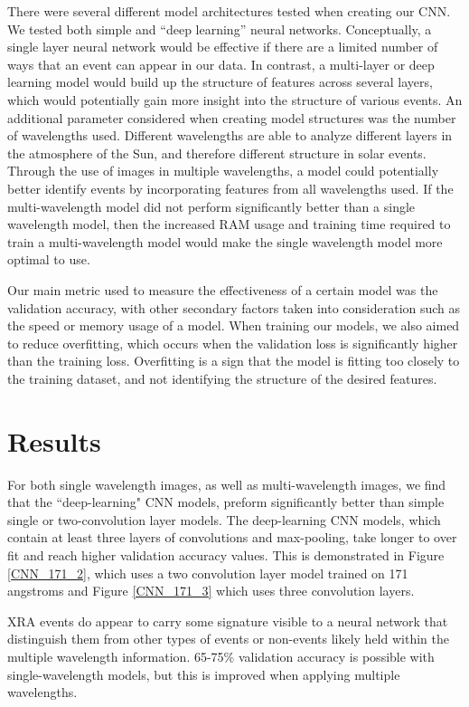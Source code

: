 \documentclass[12pt, letterpaper]{article}
\begin{document}

There were several different model architectures tested when creating our CNN. We tested both simple and “deep learning” neural networks. Conceptually, a single layer neural network would be effective if there are a limited number of ways that an event can appear in our data. In contrast, a multi-layer or deep learning model would build up the structure of features across several layers, which would potentially gain more insight into the structure of various events. An additional parameter considered when creating model structures was the number of wavelengths used. Different wavelengths are able to analyze different layers in the atmosphere of the Sun, and therefore different structure in solar events. Through the use of images in multiple wavelengths, a model could potentially better identify events by incorporating features from all wavelengths used. If the multi-wavelength model did not perform significantly better than a single wavelength model, then the increased RAM usage and training time required to train a multi-wavelength model would make the single wavelength model more optimal to use. 

Our main metric used to measure the effectiveness of a certain model was the validation accuracy, with other secondary factors taken into consideration such as the speed or memory usage of a model. When training our models, we also aimed to reduce overfitting, which occurs when the validation loss is significantly higher than the training loss. Overfitting is a sign that the model is fitting too closely to the training dataset, and not identifying the structure of the desired features.

\section*{Results}

For both single wavelength images, as well as multi-wavelength images, we find that the ``deep-learning" CNN models, preform significantly better than simple single or two-convolution layer models. The deep-learning CNN models, which contain at least three layers of convolutions and max-pooling, take longer to over fit and reach higher validation accuracy values. This is demonstrated in Figure \ref{CNN_171_2}, which uses a two convolution layer model trained on 171 angstroms and Figure \ref{CNN_171_3} which uses three convolution layers.

XRA events do appear to carry some signature visible to a neural network that distinguish them from other types of events or non-events likely held within the multiple wavelength information. 65-75\% validation accuracy is possible with single-wavelength models, but this is improved when applying multiple wavelengths. 
\end{document}
